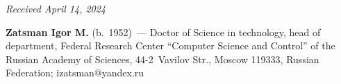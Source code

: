 \vspace*{-6pt}

\hfill{\small\textit{Received April 14, 2024}} 


\vspace*{-12pt}


\Contrl

\vspace*{-3pt}

\noindent
\textbf{Zatsman Igor M.} (b.\ 1952)~--- Doctor of Science in technology, head of 
department, Federal Research Center ``Computer Science and Control'' of the 
Russian Academy of Sciences, 44-2~Vavilov Str., Moscow 119333, Russian 
Federation; \mbox{izatsman@yandex.ru}





\label{end\stat}

\renewcommand{\bibname}{\protect\rm Литература} 